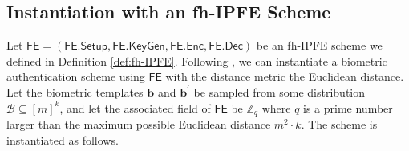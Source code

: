 


\pagebreak


\subsection{Instantiation with an fh-IPFE Scheme}
\label{sec:fh-IPFE-instantiation}

Let $\textsf{FE} = (\textsf{FE.Setup}, \textsf{FE.KeyGen}, \textsf{FE.Enc}, \textsf{FE.Dec})$ be an fh-IPFE scheme we defined in Definition \ref{def:fh-IPFE}. Following \cite{cryptoeprint:2023/481}, we can instantiate a biometric authentication scheme using $\textsf{FE}$ with the distance metric the Euclidean distance. Let the biometric templates $\mathbf{b}$ and $\mathbf{b}^\prime$ be sampled from some distribution $\mathcal{B} \subseteq [m]^k$, and let the associated field of $\textsf{FE}$ be $\mathbb{Z}_q$ where $q$ is a prime number larger than the maximum possible Euclidean distance $m^2 \cdot k$. The scheme is instantiated as follows.

